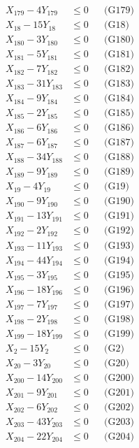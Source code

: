 \documentclass[a4paper,10pt]{article}
\begin{document}
{\begin{align}
X_{179} - 4Y_{179} &\leq 0 && \text{(G179)} \\
X_{18} - 15Y_{18} &\leq 0 && \text{(G18)} \\
X_{180} - 3Y_{180} &\leq 0 && \text{(G180)} \\
X_{181} - 5Y_{181} &\leq 0 && \text{(G181)} \\
X_{182} - 7Y_{182} &\leq 0 && \text{(G182)} \\
X_{183} - 31Y_{183} &\leq 0 && \text{(G183)} \\
X_{184} - 9Y_{184} &\leq 0 && \text{(G184)} \\
X_{185} - 2Y_{185} &\leq 0 && \text{(G185)} \\
X_{186} - 6Y_{186} &\leq 0 && \text{(G186)} \\
X_{187} - 6Y_{187} &\leq 0 && \text{(G187)} \\
X_{188} - 34Y_{188} &\leq 0 && \text{(G188)} \\
\allowbreak
X_{189} - 9Y_{189} &\leq 0 && \text{(G189)} \\
X_{19} - 4Y_{19} &\leq 0 && \text{(G19)} \\
X_{190} - 9Y_{190} &\leq 0 && \text{(G190)} \\
X_{191} - 13Y_{191} &\leq 0 && \text{(G191)} \\
X_{192} - 2Y_{192} &\leq 0 && \text{(G192)} \\
X_{193} - 11Y_{193} &\leq 0 && \text{(G193)} \\
X_{194} - 44Y_{194} &\leq 0 && \text{(G194)} \\
X_{195} - 3Y_{195} &\leq 0 && \text{(G195)} \\
X_{196} - 18Y_{196} &\leq 0 && \text{(G196)} \\
X_{197} - 7Y_{197} &\leq 0 && \text{(G197)} \\
X_{198} - 2Y_{198} &\leq 0 && \text{(G198)} \\
X_{199} - 18Y_{199} &\leq 0 && \text{(G199)} \\
X_{2} - 15Y_{2} &\leq 0 && \text{(G2)} \\
X_{20} - 3Y_{20} &\leq 0 && \text{(G20)} \\
X_{200} - 14Y_{200} &\leq 0 && \text{(G200)} \\
X_{201} - 9Y_{201} &\leq 0 && \text{(G201)} \\
X_{202} - 6Y_{202} &\leq 0 && \text{(G202)} \\
X_{203} - 43Y_{203} &\leq 0 && \text{(G203)} \\
X_{204} - 22Y_{204} &\leq 0 && \text{(G204)} \\

\end{align}}
\end{document}
